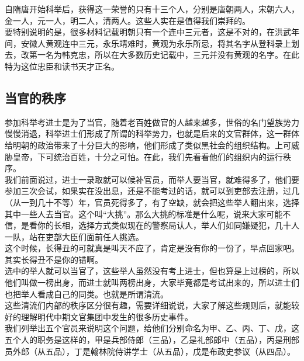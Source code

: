 \begin{multicols}{\theparacolNo}
自隋唐开始科举后，获得这一荣誉的只有十三个人，分别是唐朝两人，宋朝六人，金一人，元一人，明二人，清两人。这些人实在是值得我们崇拜的。\\

要特别说明的是，很多材料记载明朝只有一个连中三元者，这是不对的，在洪武年间，安徽人黄观连中三元，永乐靖难时，黄观为永乐所忌，将其名字从登科录上划去，改第一名为韩克忠，所以在大多数历史记载中，三元并没有黄观的名字。在此特为这位忠臣和读书天才正名。\\

\subsection{当官的秩序}
参加科举考进士是为了当官，随着老百姓做官的人越来越多，世俗的名门望族势力慢慢消退，科举进士们形成了所谓的科举势力，也就是后来的文官群体，这一群体给明朝的政治带来了十分巨大的影响，他们形成了类似黑社会的组织结构。上可威胁皇帝，下可统治百姓，十分之可怕。在此，我们先看看他们的组织内的运行秩序。\\

我们前面说过，进士一录取就可以候补官员，而举人要当官，就难得多了，他们要参加三次会试，如果实在没出息，还是不能考过的话，就可以到吏部去注册，过几（从一到几十不等）年，官员死得多了，有了空缺，就会把这些举人翻出来，选择其中一些人去当官。这个叫“大挑”。那么大挑的标准是什么呢，说来大家可能不信，是看你的长相，选择方式类似现在的警察局认人，举人们如同嫌疑犯，几十人一队，站在吏部大臣们面前任人挑选。\\

这个时候，长得丑的可就真是叫天不应了，肯定是没有你的一份了，早点回家吧。\\

其实长得丑不是你的错啊。\\

选中的举人就可以当官了，这些举人虽然没有考上进士，但也算是上过榜的，所以他们叫做一榜出身，而进士就叫两榜出身，大家毕竟都是考试出来的，所以进士们也把举人看成自己的同类。也就是所谓清流。\\

这些清流们内部的秩序区分很有趣，需要详细说说，大家了解这些规则后，就能较好的理解明代中期文官集团中发生的很多历史事件。\\

我们列举出五个官员来说明这个问题，给他们分别命名为甲、乙、丙、丁、戊，这五个人的职务是这样的，甲是兵部侍郎（三品），乙是礼部郎中（五品），丙是刑部员外郎（从五品），丁是翰林院侍讲学士（从五品），戊是布政史参议（从四品）。\\


\end{multicols}
